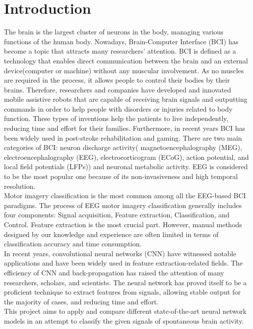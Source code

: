 \documentclass[]{report}
\begin{document}
\chapter*{Introduction}
The brain is the largest cluster of neurons in the body, managing various functions of the human body. Nowadays, Brain-Computer Interface (BCI) has become a topic that attracts many researchers' attention. BCI is defined as a technology that enables direct communication between the brain and an external device(computer or machine) without any muscular involvement. As no muscles are required in the process, it allows people to control their bodies by their brains. Therefore, researchers and companies have developed and innovated mobile assistive robots that are capable of receiving brain signals and outputting commands in order to help people with disorders or injuries related to body function. These types of inventions help the patients to live independently, reducing time and effort for their families. Furthermore, in recent years BCI has been widely used in post-stroke rehabilitation and gaming. 
There are two main categories of BCI: neuron discharge activity( magnetoencephalography (MEG), electroencephalography (EEG), electrocorticogram (ECoG), action potential, and local field potentials (LFPs)) and neuronal metabolic activity. EEG is considered to be the most popular one because of its non-invasiveness and high temporal resolution.\\
Motor imagery classification is the most common among all the EEG-based BCI paradigms. The process of EEG motor imagery classification generally includes four components: Signal acquisition, Feature extraction, Classification, and Control. Feature extraction is the most crucial part. However, manual methods designed by our knowledge and experience are often limited in terms of classification accuracy and time consumption. \\
In recent years, convolutional neural networks (CNN) have witnessed notable applications and have been widely used in feature extraction-related fields. The efficiency of CNN and back-propagation has raised the attention of many researchers, scholars, and scientists. The neural network has proved itself to be a proficient technique to extract features from signals, allowing stable output for the majority of cases, and reducing time and effort.\\
This project aims to apply and compare different state-of-the-art neural network models in an attempt to classify the given signals of spontaneous brain activity.
\end{document}
